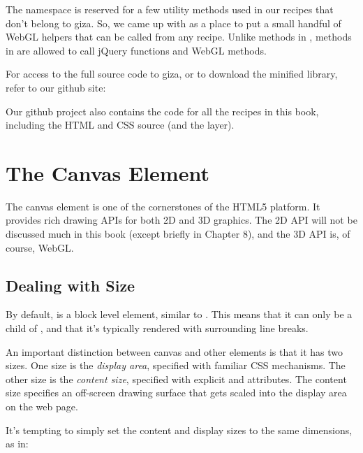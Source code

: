 The  namespace is reserved for a few utility methods used in our recipes that don't belong to giza.  So, we came up with  as a place to put a small handful of WebGL helpers that can be called from any recipe.  Unlike methods in , methods in  are allowed to call jQuery functions and WebGL methods.

For access to the full source code to giza, or to download the minified library, refer to our github site:


Our github project also contains the code for all the recipes in this book, including the HTML and CSS source (and the  layer).

\section{The Canvas Element}

The canvas element  is one of the cornerstones of the HTML5 platform.  It provides rich drawing APIs for both 2D and 3D graphics.  The 2D API will not be discussed much in this book (except briefly in Chapter 8), and the 3D API is, of course, WebGL.

\subsection{Dealing with Size}

By default,  is a block level element, similar to .  This means that it can only be a child of , and that it's typically rendered with surrounding line breaks.

An important distinction between canvas and other elements is that it has two  sizes.  One size is the \emph{display area}, specified with familiar  CSS mechanisms.  The other size is the \emph{content size}, specified with explicit   and   attributes.  The content size specifies an off-screen drawing surface that gets scaled into the display area on the web page.

It's tempting to simply set the content and display sizes to the same dimensions, as in:

